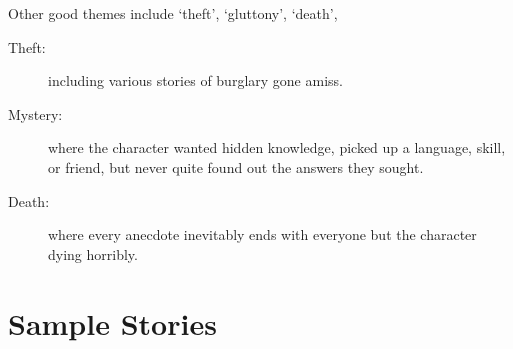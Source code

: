 \begin{multicols}{2}
Other good themes include `theft', `gluttony', `death', 

\begin{description}
  \item[Theft:]
  including various stories of burglary gone amiss.
  \item[Mystery:]
  where the character wanted hidden knowledge, picked up a language, skill, or friend, but never quite found out the answers they sought.
  \item[Death:]
  where every anecdote inevitably ends with everyone but the character dying horribly.
\end{description}

\end{multicols}

\section{Sample Stories}


